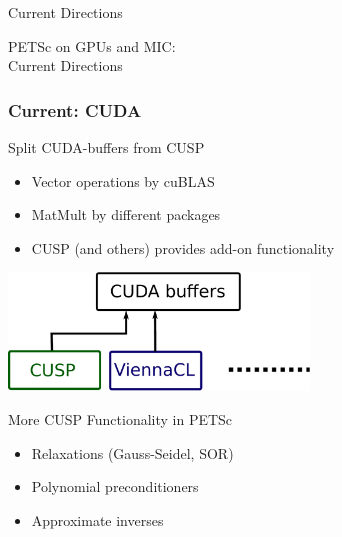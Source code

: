 


\begin{frame}{Current Directions}
  \begin{center}
    \Large PETSc on GPUs and MIC: \\[1em] Current Directions \\[1em]
  \end{center}
\end{frame}


\begin{frame}[fragile]
\frametitle{Current: CUDA}
  \begin{block}{Split CUDA-buffers from CUSP}
  \begin{itemize}
   \item Vector operations by cuBLAS
   \item MatMult by different packages
   \item CUSP (and others) provides add-on functionality
  \end{itemize}
  \end{block}
  
  \begin{center}
   \includegraphics[width=0.6\textwidth]{figures/cuda-arch}
  \end{center}

  \begin{block}{More CUSP Functionality in PETSc}
   \begin{itemize}
    \item Relaxations (Gauss-Seidel, SOR)
    \item Polynomial preconditioners
    \item Approximate inverses
   \end{itemize}
  \end{block}

\end{frame}


